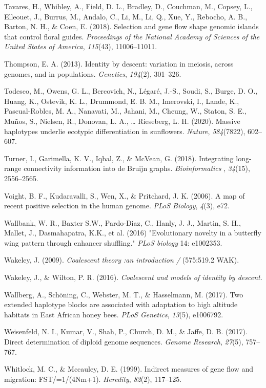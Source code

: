 \documentclass[twocolumn]{bmcart}%
\begin{document}
\begin{backmatter}
\begin{hangparas}{1em}{1}
Tavares, H., Whibley, A., Field, D. L., Bradley, D., Couchman, M.,
Copsey, L., Elleouet, J., Burrus, M., Andalo, C., Li, M., Li, Q., Xue,
Y., Rebocho, A. B., Barton, N. H., \& Coen, E. (2018). Selection and
gene flow shape genomic islands that control floral guides.
\emph{Proceedings of the National Academy of Sciences of the United
States of America}, \emph{115}(43), 11006--11011.

Thompson, E. A. (2013). Identity by descent: variation in meiosis,
across genomes, and in populations. \emph{Genetics}, \emph{194}(2),
301--326.

Todesco, M., Owens, G. L., Bercovich, N., Légaré, J.-S., Soudi, S.,
Burge, D. O., Huang, K., Ostevik, K. L., Drummond, E. B. M., Imerovski,
I., Lande, K., Pascual-Robles, M. A., Nanavati, M., Jahani, M., Cheung,
W., Staton, S. E., Muños, S., Nielsen, R., Donovan, L. A., \ldots{}
Rieseberg, L. H. (2020). Massive haplotypes underlie ecotypic
differentiation in sunflowers. \emph{Nature}, \emph{584}(7822),
602--607.

Turner, I., Garimella, K. V., Iqbal, Z., \& McVean, G. (2018).
Integrating long-range connectivity information into de Bruijn graphs.
\emph{Bioinformatics} , \emph{34}(15), 2556--2565.

Voight, B. F., Kudaravalli, S., Wen, X., \& Pritchard, J. K. (2006). A
map of recent positive selection in the human genome. \emph{PLoS
Biology}, \emph{4}(3), e72.

Wallbank, W. R., Baxter S.W., Pardo-Diaz, C., Hanly, J. J., Martin, S.
H., Mallet, J., Dasmahapatra, K.K., et al. (2016) "Evolutionary novelty
in a butterfly wing pattern through enhancer shuffling." \emph{PLoS
biology} 14: e1002353.

Wakeley, J. (2009). \emph{Coalescent theory :an introduction /}
(575:519.2 WAK). 

Wakeley, J., \& Wilton, P. R. (2016). \emph{Coalescent and models of
identity by descent}.

Wallberg, A., Schöning, C., Webster, M. T., \& Hasselmann, M. (2017).
Two extended haplotype blocks are associated with adaptation to high
altitude habitats in East African honey bees. \emph{PLoS Genetics},
\emph{13}(5), e1006792.

Weisenfeld, N. I., Kumar, V., Shah, P., Church, D. M., \& Jaffe, D. B.
(2017). Direct determination of diploid genome sequences. \emph{Genome
Research}, \emph{27}(5), 757--767.

Whitlock, M. C., \& Mccauley, D. E. (1999). Indirect measures of gene
flow and migration: FST/=1/(4Nm+1). \emph{Heredity}, \emph{82}(2),
117--125.


\end{hangparas}
\end{backmatter}
\end{document}
